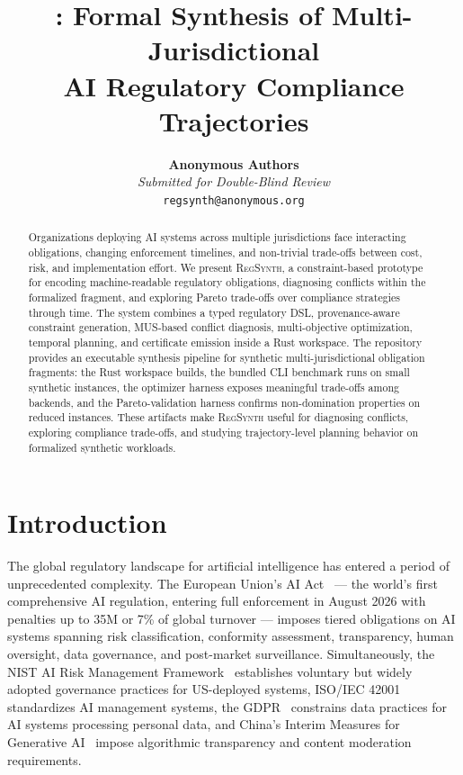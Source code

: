 \documentclass[11pt,twocolumn]{article}
\title{\textbf{\regsynth{}: Formal Synthesis of Multi-Jurisdictional\\AI Regulatory Compliance Trajectories}}
\author{
  \textbf{Anonymous Authors}\\
  \textit{Submitted for Double-Blind Review}\\
  \texttt{regsynth@anonymous.org}
}
\date{}
\newcommand{\regsynth}{\textsc{RegSynth}}
\begin{document}
\maketitle

\begin{abstract}
Organizations deploying AI systems across multiple jurisdictions face interacting obligations, changing enforcement timelines, and non-trivial trade-offs between cost, risk, and implementation effort. We present \regsynth{}, a constraint-based prototype for encoding machine-readable regulatory obligations, diagnosing conflicts within the formalized fragment, and exploring Pareto trade-offs over compliance strategies through time. The system combines a typed regulatory DSL, provenance-aware constraint generation, MUS-based conflict diagnosis, multi-objective optimization, temporal planning, and certificate emission inside a Rust workspace. The repository provides an executable synthesis pipeline for synthetic multi-jurisdictional obligation fragments: the Rust workspace builds, the bundled CLI benchmark runs on small synthetic instances, the optimizer harness exposes meaningful trade-offs among backends, and the Pareto-validation harness confirms non-domination properties on reduced instances. These artifacts make \regsynth{} useful for diagnosing conflicts, exploring compliance trade-offs, and studying trajectory-level planning behavior on formalized synthetic workloads.
\end{abstract}

\section{Introduction}
\label{sec:intro}

The global regulatory landscape for artificial intelligence has entered a period
of unprecedented complexity. The European Union's AI Act~\cite{euaiact2024} —
the world's first comprehensive AI regulation, entering full enforcement in
August 2026 with penalties up to \texteuro{}35M or 7\% of global turnover — imposes
tiered obligations on AI systems spanning risk classification, conformity
assessment, transparency, human oversight, data governance, and post-market
surveillance. Simultaneously, the NIST AI Risk Management Framework~\cite{nistrmf2023}
establishes voluntary but widely adopted governance practices for US-deployed
systems, ISO/IEC 42001~\cite{iso42001} standardizes AI management systems, the
GDPR~\cite{gdpr2016} constrains data practices for AI systems processing personal
data, and China's Interim Measures for Generative AI~\cite{chinagai2023} impose
algorithmic transparency and content moderation requirements.
\end{document}

